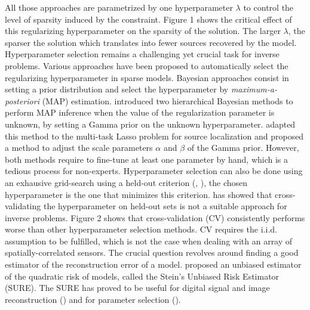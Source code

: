 All those approaches are parametrized by one hyperparameter $\lambda$ to control the level of 
sparsity induced by the constraint. Figure 1 shows the critical effect of this regularizing hyperparameter 
on the sparsity of the solution. The larger $\lambda$, the sparser the solution which translates
into fewer sources recovered by the model. Hyperparameter selection remains a challenging yet crucial task
for inverse problems. Various approaches have been proposed to automatically select the regularizing 
hyperparameter in sparse models. Bayesian approaches consist in setting a prior distribution 
and select the hyperparameter by \textit{maximum-a-posteriori} (MAP) estimation. 
\cite{Pereyra_BioucasDias_Figueiredo_2015} introduced two hierarchical Bayesian methods to perform MAP 
inference when the value of the regularization parameter is unknown, by setting a Gamma prior on the 
unknown hyperparameter. \cite{Bekhti_Badeau_Gramfort_2017} adapted this method to the multi-task Lasso problem
for source localization and proposed a method to adjust the scale parameters $\alpha$ and $\beta$
of the Gamma prior. However, both methods require to fine-tune at least one parameter by hand, which is a
tedious process for non-experts. Hyperparameter selection can also be done using an exhausive
grid-search using a held-out criterion (\cite{Bergstra_Bengio12}, \cite{BergstraBardenetBengioKegl2011}), 
the chosen hyperparameter is the one that minimizes this criterion. \cite{Pedregosa16} has 
showed that cross-validating the hyperparameter on held-out sets is not a suitable approach for inverse 
problems. Figure 2 shows that cross-validation (CV) consistently performs worse than other 
hyperparameter selection methods. CV requires the i.i.d. assumption to be fulfilled, which is 
not the case when dealing with an array of spatially-correlated sensors. The crucial question revolves around
finding a good estimator of the reconstruction error of a model. \cite{Stein81} proposed an unbiased estimator
of the quadratic risk of models, called the Stein's Unbiased Risk Estimator (SURE). The SURE has proved to be 
useful for digital signal and image reconstruction (\cite{Pesquet_Benazza_Chaux_2009}) and for
parameter selection (\cite{Deledalle_Vaiter_Fadili_Peyre14}).

